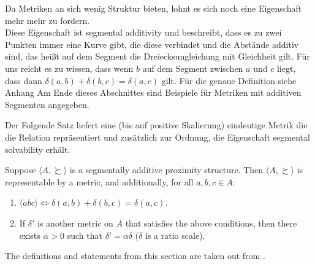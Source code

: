 

Da Metriken an sich wenig Struktur bieten, lohnt es sich noch eine Eigenschaft mehr mehr zu fordern.\\
Diese Eigenschaft ist segmental additivity und beschreibt, dass es zu zwei Punkten immer eine Kurve gibt, die diese verbindet und die Abstände additiv sind, das heißt auf dem Segment die Dreiecksungleichung mit Gleichheit gilt. Für uns reicht es zu wissen, dass wenn $b$ auf dem Segment zwischen $a$ und $c$ liegt, dass dann $\delta(a,b) + \delta(b,c) = \delta(a, c)$ gilt.
Für die genaue Definition siehe Anhang %
Am Ende dieses Abschnittes sind Beispiele für Metriken mit additiven Segmenten angegeben.


Der Folgende Satz liefert eine (bis auf positive Skalierung) eindeutige Metrik die die Relation repräsentiert und zusätzlich zur Ordnung, die Eigenschaft segmental solvability erhält.

\begin{thm}
Suppose $\langle A, \succsim \rangle$ is a segmentally additive proximity structure. Then $\langle A, \succsim \rangle$ is representable by a metric, and additionally, for all $a, b, c \in A$:
\begin{enumerate}
    \item $\langle abc \rangle \iff \delta(a, b) + \delta(b, c) = \delta(a, c)$.
    \item If $\delta'$ is another metric on $A$ that satisfies the above conditions, then there exists $\alpha > 0$ such that $\delta' = \alpha \delta$ ($\delta$ is a ratio scale).
\end{enumerate}
\end{thm}


  \begin{defi} 
  
  \end{defi}

  The definitions and statements from this section are taken out from \parencite{busemann}.

